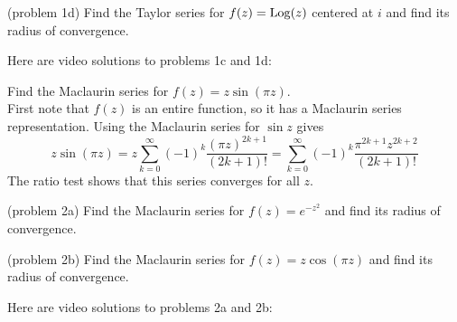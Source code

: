 \documentclass[handout]{ximera}
\begin{document}
\begin{problem}(problem 1d)
Find the Taylor series for $f(z) = \operatorname{Log}(z)$ centered at $i$ and find its radius of convergence.
\end{problem}

Here are video solutions to problems 1c and 1d:\\
\begin{foldable}
\end{foldable}


\begin{example}[example 2]
Find the Maclaurin series for $f(z) = z\sin(\pi z)$.\\
First note that $f(z)$ is an entire function, so it has a Maclaurin series representation.
Using the Maclaurin series for $\sin z$ gives
\[
z\sin(\pi z) = z\sum_{k=0}^\infty (-1)^k \frac{(\pi z)^{2k+1}}{(2k+1)!} = \sum_{k=0}^\infty (-1)^k \frac{\pi^{2k+1} z^{2k+2}}{(2k+1)!}
\]
The ratio test shows that this series converges for all $z$.
\end{example}

\begin{problem}(problem 2a)
Find the Maclaurin series for $f(z) = e^{-z^2}$ and find its radius of convergence.
\end{problem}

\begin{problem}(problem 2b)
Find the Maclaurin series for $f(z) = z\cos(\pi z)$ and find its radius of convergence.
\end{problem}

Here are video solutions to problems 2a and 2b:\\
\begin{foldable}
\end{foldable}
\end{document}
